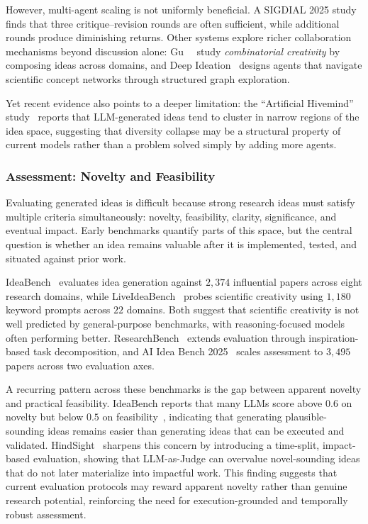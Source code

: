 However, multi-agent scaling is not uniformly beneficial. A SIGDIAL 2025 study~\cite{sigdial2025multiagent} finds that three critique--revision rounds are often sufficient, while additional rounds produce diminishing returns. Other systems explore richer collaboration mechanisms beyond discussion alone: Gu~\etal~\cite{gu2024combinatorial} study \emph{combinatorial creativity} by composing ideas across domains, and Deep Ideation~\cite{zhao2025deepideation} designs agents that navigate scientific concept networks through structured graph exploration. 

Yet recent evidence also points to a deeper limitation: the ``Artificial Hivemind'' study~\cite{jiang2025artificialhivemind} reports that LLM-generated ideas tend to cluster in narrow regions of the idea space, suggesting that diversity collapse may be a structural property of current models rather than a problem solved simply by adding more agents.



\subsubsection{Assessment: Novelty and Feasibility}
\label{sec:idea_eval}

Evaluating generated ideas is difficult because strong research ideas must satisfy multiple criteria simultaneously: novelty, feasibility, clarity, significance, and eventual impact. Early benchmarks quantify parts of this space, but the central question is whether an idea remains valuable after it is implemented, tested, and situated against prior work.

IdeaBench~\cite{guo2025ideabench} evaluates idea generation against $2{,}374$ influential papers across eight research domains, while LiveIdeaBench~\cite{liveideabench2024} probes scientific creativity using $1{,}180$ keyword prompts across $22$ domains. Both suggest that scientific creativity is not well predicted by general-purpose benchmarks, with reasoning-focused models often performing better. ResearchBench~\cite{researchbench2025} extends evaluation through inspiration-based task decomposition, and AI Idea Bench 2025~\cite{aiideabench2025} scales assessment to $3{,}495$ papers across two evaluation axes.

A recurring pattern across these benchmarks is the gap between apparent novelty and practical feasibility. IdeaBench reports that many LLMs score above $0.6$ on novelty but below $0.5$ on feasibility~\cite{guo2025ideabench}, indicating that generating plausible-sounding ideas remains easier than generating ideas that can be executed and validated. HindSight~\cite{hindsight2026} sharpens this concern by introducing a time-split, impact-based evaluation, showing that LLM-as-Judge can overvalue novel-sounding ideas that do not later materialize into impactful work. This finding suggests that current evaluation protocols may reward apparent novelty rather than genuine research potential, reinforcing the need for execution-grounded and temporally robust assessment.



